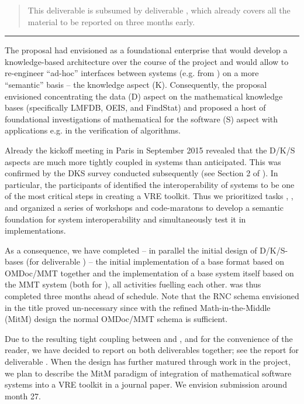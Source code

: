 \documentclass{deliverablereport}
\author{Michael Kohlhase, Florian Rabe, Tom Wiesing, Paul-Olivier Dehaye, Dennis M\"uller}
\begin{document}
\begin{abstract}
  This deliverable is subsumed by deliverable , which already
  covers all the material to be reported on three months early.
\end{abstract}

\maketitle
\githubissuedescription\par\bigskip\hrule\par\bigskip

The \pn proposal had envisioned  as a foundational enterprise that would
develop a knowledge-based architecture over the course of the project and would allow to
re-engineer ``ad-hoc'' interfaces between systems (e.g. from
) on a more ``semantic'' basis -- the
knowledge aspect (K). Consequently, the proposal envisioned concentrating the data (D)
aspect on the mathematical knowledge bases (specifically LMFDB, OEIS, and FindStat) and
proposed a host of foundational investigations of mathematical for the software (S) aspect
with applications e.g. in the verification of algorithms.

Already the kickoff meeting in Paris in September 2015 revealed that the D/K/S aspects are
much more tightly coupled in systems than anticipated. This was confirmed by the DKS
survey conducted subsequently (see Section 2 of ). In
particular, the participants of  identified the interoperability of \pn
systems to be one of the most critical steps in creating a VRE toolkit. Thus we
prioritized tasks , ,
 and organized a series of workshops and code-maratons to
develop a semantic foundation for system interoperability and simultaneously test it in
implementations.

As a consequence, we have completed -- in parallel the initial design of D/K/S-bases (for
deliverable ) -- the initial implementation of a \DKS base
format based on OMDoc/MMT together and the implementation of a \DKS base system itself
based on the MMT system (both for ), all activities
fuelling each other.   was thus completed three months
ahead of schedule.  Note that the RNC schema envisioned in the title proved un-necessary
since with the refined Math-in-the-Middle (MitM) design the normal OMDoc/MMT schema is
sufficient.

Due to the resulting tight coupling between  and
, and for the convenience of the reader, we have decided
to report on both deliverables together; see the report for deliverable
. When the design has further matured through work in the \pn
project, we plan to describe the MitM paradigm of integration of mathematical software
systems into a VRE toolkit in a journal paper. We envision submission around month 27. 
\newpage
\end{document}
